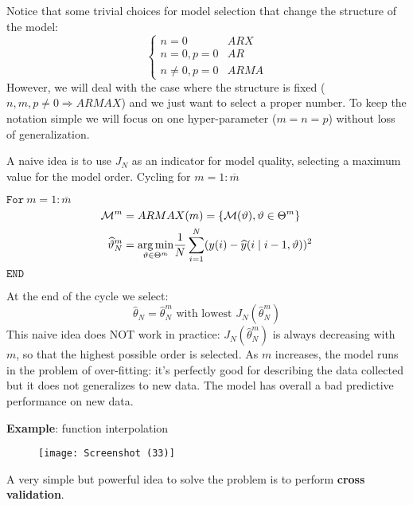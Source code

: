 Notice that some trivial choices for model selection that change the structure of the model:
\begin{equation*}
\begin{cases}
n=0 & ARX\\
n=0,p=0 & AR\\
n\neq 0,p=0 & ARMA
\end{cases}
\end{equation*}
However, we will deal with the case where the structure is fixed ($ n,m,p\neq 0\Longrightarrow ARMAX$) and we just want to select a proper number. To keep the notation simple we will focus on one hyper-parameter ($ m=n=p$) without loss of generalization.



A naive idea is to use $ J_{N}$ as an indicator for model quality, selecting a maximum value for the model order. Cycling for $ m=1:\overline{m}$

$ \mathtt{For }\ m=1:\overline{m}$
\begin{equation*}
\begin{aligned}
\mathcal{M}^{m} & =ARMAX(m) =\left\{\mathcal{M}(\vartheta) ,\vartheta \in \Theta ^{m}\right\}\\
\widehat{\vartheta }_{N}^{m} & =\underset{\vartheta \in \Theta ^{m}}{\operatorname*{arg\,min}}\frac{1}{N}\sum _{i=1}^{N}(y(i) -\widehat{y}(i\mid i-1,\vartheta))^{2}
\end{aligned}
\end{equation*}
$ \mathtt{END}$

At the end of the cycle we select:
\begin{equation*}
\hat{\theta }_{N} =\hat{\theta }_{N}^{m} \text{ with lowest } J_{N}\left(\hat{\theta }_{N}^{m}\right)
\end{equation*}
This naive idea does NOT work in practice: $ J_{N}\left(\hat{\theta }_{N}^{m}\right)$ is always decreasing with $ m$, so that the highest possible order is selected. As $ m$ increases, the model runs in the problem of over-fitting: it's perfectly good for describing the data collected but it does not generalizes to new data. The model has overall a bad predictive performance on new data.



\textbf{Example}: function interpolation
\begin{figure}[htpb]
    \centering
    \texttt{[image: Screenshot (33)]}
\end{figure}
\FloatBarrier

A very simple but powerful idea to solve the problem is to perform \textbf{cross validation}.

